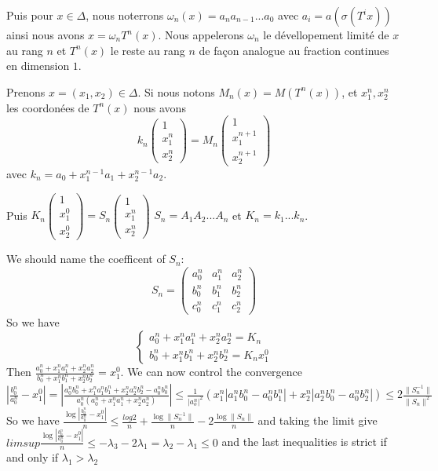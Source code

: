  Puis pour $x \in \Delta$, nous noterrons $\omega_n(x)=a_n a_{n-1} ... a_0$ avec $a_i=a(\sigma(T^i x))$\newline
ainsi nous avons $x=\omega_n T^n(x)$.
\newline
Nous appelerons $\omega_n$ le dévellopement limité de $x$ au rang $n$ et $T^n(x)$ le reste au rang $n$ de façon analogue au fraction continues en dimension $1$.

Prenons $x=(x_1,x_2) \in \Delta$. Si nous notons $M_n(x)=M(T^n(x))$, et $x^n_1,x^n_2$ les coordonées de $T^n(x)$ nous avons
\[ k_n
\begin{pmatrix} 1 \\ x_1^n \\ x_2^n \end{pmatrix}=
M_n \begin{pmatrix} 1 \\ x_1^{n+1} \\ x_2^{n+1} \end{pmatrix}
\]
avec $k_n=a_0+x^{n-1}_1 a_1 + x^{n-1}_2 a_2$.\newline

Puis $K_n \begin{pmatrix} 1 \\x_1^0 \\ x_2^0 \end{pmatrix} = S_n \begin{pmatrix} 1 \\ x_1^n \\ x_2^n \end{pmatrix}$\newline
$S_n=A_1 A_2 ... A_n$ et $K_n=k_1 ... k_n$.

We should name the coefficent of $S_n$:$$
S_n=\begin{pmatrix}
a_0^n & a_1^n & a_2^n \\
b_0^n & b_1^n & b_2^n \\
c_0^n & c_1^n & c_2^n
\end{pmatrix}
$$
So we have
$$
\left \{
\begin{array}{l}
a_0^n+x_1^n a_1^n +x_2^n a_2^n=K_n\\
b_0^n+x_1^n b_1^n +x_2^n b_2^n=K_n x_1^0
\end{array}
\right .
$$
Then $\frac{a_0^n+x_1^n a_1^n +x_2^n a_2^n}{b_0^n+x_1^n b_1^n +x_2^n b_2^n}=x_1^0$.\newline
We can now control the convergence $| \frac{b_0^n}{a_0^n}-x_1^0 |= | \frac{a_0^n b_0^n+x_1^n a_1^n b_1^n +x_2^n a_2^n b_2^n-a_0^n b_0^n}{a_0^n(a_0^n+x_1^n a_1^n +x_2^n a_2^n)} | \leq \frac{1}{|a_o^n|^2}(x_1^n |a_1^n b_0^n - a_0^n b_1^n |+x_2^n |a_2^n b_0^n - a_0^n b_2^n |) \leq 2 \frac{\|S_n^{-1} \|}{\| S_n \|^2}$\newline
So we have $\frac{\log{| \frac{b_0^n}{a_0^n}-x_1^0 |}}{n} \leq \frac{log{2}}{n}+\frac{\log {\|S_n^{-1}\|}}{n}-2\frac{\log{\|S_n\|}}{n}$ and taking the limit give $limsup \frac{\log{| \frac{b_0^n}{a_0^n}-x_1^0 |}}{n} \leq -\lambda_3-2\lambda_1=\lambda_2-\lambda_1 \leq 0 $ and the last inequalities is strict if and only if $\lambda_1 > \lambda_2$

